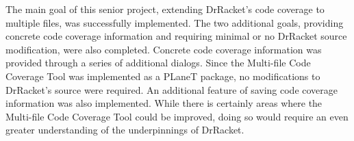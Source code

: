 The main goal of this senior project, extending DrRacket's code coverage to multiple files, was successfully implemented. The two additional goals, providing concrete code coverage information and requiring minimal or no DrRacket source modification, were also completed. Concrete code coverage information was provided through a series of additional dialogs. Since the Multi-file Code Coverage Tool was implemented as a PLaneT package, no modifications to DrRacket's source were required. An additional feature of saving code coverage information was also implemented. While there is certainly areas where the Multi-file Code Coverage Tool could be improved, doing so would require an even greater understanding of the underpinnings of DrRacket. 
